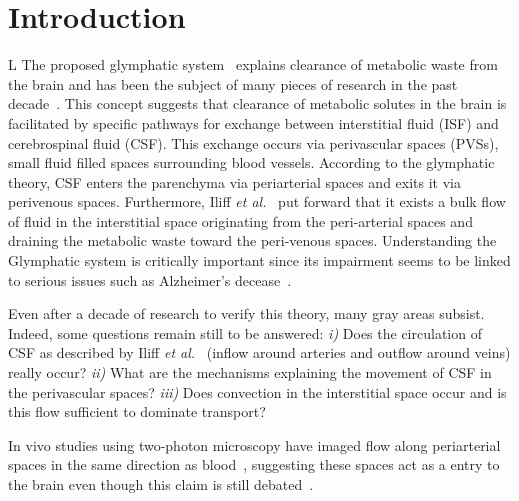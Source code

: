 \documentclass[10pt,letterpaper]{article}
\newcommand{\etal}{\emph{et al.}\;}
\newcommand{\1}{^{(1)}}
\newcommand{\2}{^{(2)}}
\begin{document}
\section*{Introduction}
L%
The proposed glymphatic system~\cite{Iliff_2012_PVS} explains clearance of metabolic waste from the brain and has been the subject of many pieces of research in the past decade~\cite{Holter9894,abbott_role_2018,jessen_glymphatic_2015}.
 This concept suggests that clearance of metabolic solutes in the brain is facilitated by specific pathways for exchange between interstitial fluid (ISF) and cerebrospinal fluid (CSF). This exchange occurs via perivascular spaces (PVSs), small fluid filled spaces surrounding blood vessels. 
According to the glymphatic theory, CSF enters the parenchyma via periarterial spaces and exits it via perivenous spaces. Furthermore, Iliff \etal~\cite{Iliff_2012_PVS} put forward that it exists a bulk flow of fluid in the interstitial space originating from the peri-arterial spaces and draining the metabolic waste toward the peri-venous spaces.  
Understanding the Glymphatic system is critically important since its impairment seems to be linked to serious issues such as Alzheimer's decease~\cite{reeves_glymphatic_2020}.

Even after a decade of research to verify this theory, many gray areas subsist. Indeed, some questions remain still to be answered: 
\textit{i)} Does the circulation of CSF as described by Iliff \etal~\cite{Iliff_2012_PVS} (inflow around arteries and outflow around veins) really occur? 
\textit{ii)} What are the mechanisms explaining the movement of CSF in the perivascular spaces?
\textit{iii)} Does convection in the interstitial space occur and is this flow sufficient to dominate transport? 




In vivo studies using two-photon microscopy have imaged flow along periarterial spaces in the same direction as blood~\cite{bedussi-2018-paravascular,mestre_flow_2018}, suggesting these spaces act as a entry to the brain even though this claim is still debated~\cite{bakker2019paravascular}. 
\end{document}
